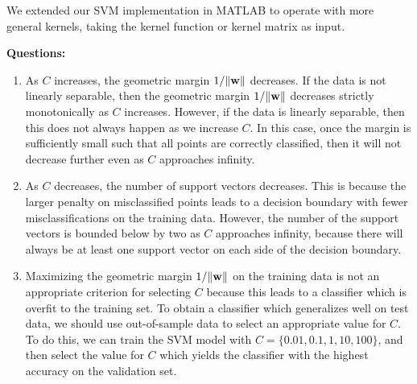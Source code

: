 We extended our SVM implementation in MATLAB to operate with more general kernels, taking the kernel function or kernel matrix as input.  

{\bf Questions:}
\begin{enumerate}[label=(\alph*)]
	\item As $C$ increases, the geometric margin $1/\|\boldsymbol{\mathbf{w}}\|$ decreases.  If the data is not linearly separable, then
	the geometric margin $1/\|\boldsymbol{\mathbf{w}}\|$ decreases strictly monotonically as $C$ increases.  However, if the data is linearly
	separable, then this does not always happen as we increase $C$.  In this case, once the margin is sufficiently small
	such that all points are correctly classified, then it will not decrease further even as $C$ approaches infinity.  
	
	\item As $C$ decreases, the number of support vectors decreases.  This is because the larger penalty on misclassified
	points leads to a decision boundary with fewer misclassifications on the training data.  However, the number of the
	support vectors is bounded below by two as $C$ approaches infinity, because there will always be at least one support vector
	on each side of the decision boundary.
	
	\item Maximizing the geometric margin $1/\|\boldsymbol{\mathbf{w}}\|$ on the training data is not an appropriate criterion for selecting
	$C$ because this leads to a classifier which is overfit to the training set.  To obtain a classifier which generalizes well
	on test data, we should use out-of-sample data to select an appropriate value for $C$.  To do this, we can train the SVM model
	with $C = \{0.01,0.1,1,10,100\}$, and then select the value for $C$ which yields the classifier with the highest
	accuracy on the validation set.  

\end{enumerate}

